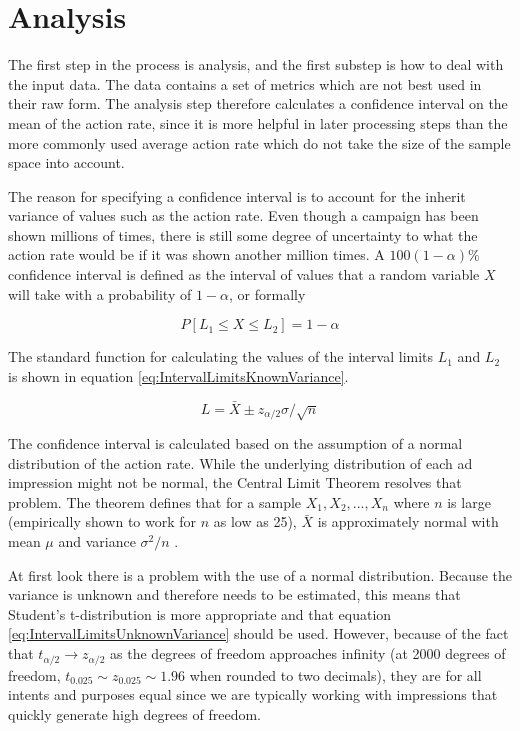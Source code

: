 \documentclass[11pt,a4paper]{report}
\begin{document}
\section{Analysis}
The first step in the process is analysis, and the first substep is how to deal with the input data. The data contains a set of metrics which are not best used in their raw form. The analysis step therefore calculates a confidence interval on the mean of the action rate, since it is more helpful in later processing steps than the more commonly used average action rate which do not take the size of the sample space into account.

The reason for specifying a confidence interval is to account for the inherit variance of values such as the action rate. Even though a campaign has been shown millions of times, there is still some degree of uncertainty to what the action rate would be if it was shown another million times. A \(100(1-\alpha)\%\) confidence interval is defined as the interval of values that a random variable \(X\) will take with a probability of \(1-\alpha\), or formally

\begin{equation}
	P[L_1 \leq X \leq L_2] = 1 - \alpha
\end{equation}

The standard function for calculating the values of the interval limits \(L_1\) and \(L_2\) is shown in equation \ref{eq:IntervalLimitsKnownVariance}.

\begin{equation}
	L = \bar{X} \pm z_{\alpha/2} \sigma/\sqrt{n}
	\label{eq:IntervalLimitsKnownVariance}
\end{equation}

The confidence interval is calculated based on the assumption of a normal distribution of the action rate. While the underlying distribution of each ad impression might not be normal, the Central Limit Theorem resolves that problem. The theorem defines that for a sample \(X_1, X_2, ..., X_n\) where \(n\) is large (empirically shown to work for \(n\) as low as 25), \(\bar{X}\) is approximately normal with mean \(\mu\) and variance \(\sigma^2/n\) \citep{Milton2002}.

At first look there is a problem with the use of a normal distribution. Because the variance is unknown and therefore needs to be estimated, this means that Student's t-distribution is more appropriate and that equation \ref{eq:IntervalLimitsUnknownVariance} should be used. However, because of the fact that \(t_{\alpha/2} \to z_{\alpha/2}\) as the degrees of freedom approaches infinity (at 2000 degrees of freedom, \(t_{0.025} \sim z_{0.025} \sim 1.96\) when rounded to two decimals), they are for all intents and purposes equal since we are typically working with impressions that quickly generate high degrees of freedom.
\end{document}

